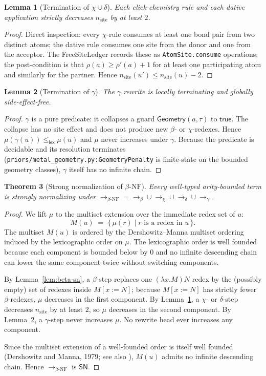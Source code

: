 \documentclass{article}
\newtheorem{theorem}{Theorem}[section]
\newtheorem{lemma}[theorem]{Lemma}
\theoremstyle{definition}
\newcommand{\bnf}{\beta\text{-NF}}
\newcommand{\sn}{\mathsf{SN}}
\newcommand{\stepsto}{\longrightarrow}
\newcommand{\stepstoBeta}{\longrightarrow_{\beta}}
\newcommand{\stepstoChem}{\longrightarrow_{\chi}}
\newcommand{\stepstoAll}{\longrightarrow_{\bnf}}
\begin{document}
\begin{lemma}[Termination of $\chi \cup \delta$]
\label{lem:chem-sn}
Each click-chemistry rule and each dative application strictly decreases
$n_{\text{site}}$ by at least $2$.
\end{lemma}
\begin{proof}
Direct inspection: every $\chi$-rule consumes at least one bond pair from
two distinct atoms; the dative rule consumes one site from the donor and
one from the acceptor. The FreeSiteLedger records these as
\texttt{AtomSite.consume} operations; the post-condition is that
$\rho(a) \ge \rho'(a) + 1$ for at least one participating atom and similarly
for the partner. Hence $n_{\text{site}}(u') \le n_{\text{site}}(u) - 2$.
\end{proof}

\begin{lemma}[Termination of $\gamma$]
\label{lem:gamma-sn}
The $\gamma$ rewrite is locally terminating and globally side-effect-free.
\end{lemma}
\begin{proof}
$\gamma$ is a pure predicate: it collapses a guard
$\mathsf{Geometry}(a,\tau)$ to $\mathsf{true}$. The collapse has no site
effect and does not produce new $\beta$- or $\chi$-redexes. Hence
$\mu(\gamma(u)) \le_{\mathsf{lex}} \mu(u)$ and $\mu$ never increases under
$\gamma$. Because the predicate is decidable and its resolution terminates
(\texttt{priors/metal\_geometry.py:GeometryPenalty} is finite-state on the
bounded geometry classes), $\gamma$ itself has no infinite chain.
\end{proof}

\begin{theorem}[Strong normalization of $\bnf$]
\label{thm:sn}
Every well-typed arity-bounded term is strongly normalizing under
$\stepstoAll = \stepstoBeta \cup \stepstoChem \cup \stepsto_{\delta} \cup
\stepsto_{\gamma}$.
\end{theorem}
\begin{proof}
We lift $\mu$ to the multiset extension over the immediate redex set of $u$:
\[
  M(u) \;=\; \{\, \mu(r) \mid r \text{ is a redex in } u \,\}.
\]
The multiset $M(u)$ is ordered by the Dershowitz--Manna multiset
ordering induced by the lexicographic order on $\mu$. The lexicographic
order is well founded because each component is bounded below by $0$ and
no infinite descending chain can lower the same component twice without
switching components.

By Lemma~\ref{lem:beta-sn}, a $\beta$-step replaces one $(\lambda x.M)N$
redex by the (possibly empty) set of redexes inside $M[x:=N]$; because
$M[x:=N]$ has strictly fewer $\beta$-redexes, $\mu$ decreases in the first
component. By Lemma~\ref{lem:chem-sn}, a $\chi$- or $\delta$-step decreases
$n_{\text{site}}$ by at least $2$, so $\mu$ decreases in the second
component. By Lemma~\ref{lem:gamma-sn}, a $\gamma$-step never increases
$\mu$. No rewrite head ever increases any component.

Since the multiset extension of a well-founded order is itself well
founded (Dershowitz and Manna, 1979; see also \cite{Girard1989}), $M(u)$
admits no infinite descending chain. Hence $\stepstoAll$ is $\sn$.
\end{proof}
\end{document}
